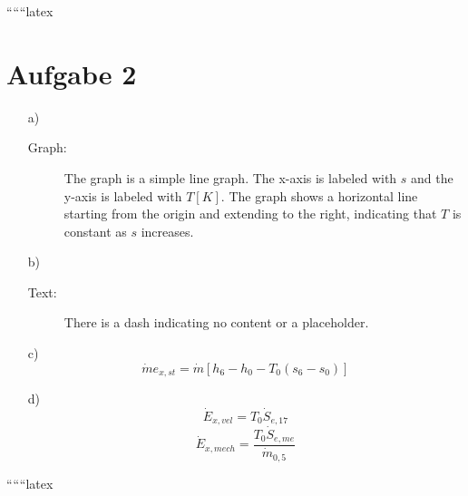 
``````latex


\section*{Aufgabe 2}

\begin{itemize}
    \item[a)] 
    \begin{description}
        \item[Graph:] The graph is a simple line graph. The x-axis is labeled with \( s \) and the y-axis is labeled with \( T [K] \). The graph shows a horizontal line starting from the origin and extending to the right, indicating that \( T \) is constant as \( s \) increases.
    \end{description}
    
    \item[b)] 
    \begin{description}
        \item[Text:] There is a dash indicating no content or a placeholder.
    \end{description}
    
    \item[c)] 
    \[
    \dot{m} e_{x,st} = \dot{m} \left[ h_6 - h_0 - T_0 (s_6 - s_0) \right]
    \]
    
    \item[d)] 
    \[
    \dot{E}_{x,vel} = T_0 \dot{S}_{e,17}
    \]
    \[
    \dot{E}_{x,mech} = \frac{T_0 \dot{S}_{e,me}}{\dot{m}_{0,5}}
    \]
\end{itemize}

``````latex


